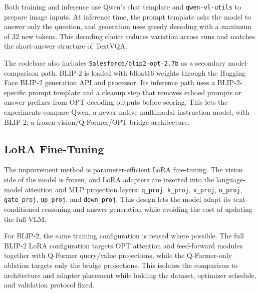 \documentclass[11pt]{article}
\begin{document}
Both training and inference use Qwen's chat template and \texttt{qwen-vl-utils} to prepare image inputs. At inference time, the prompt template asks the model to answer only the question, and generation uses greedy decoding with a maximum of 32 new tokens. This decoding choice reduces variation across runs and matches the short-answer structure of TextVQA.

The codebase also includes \texttt{Salesforce/blip2-opt-2.7b} as a secondary model-comparison path. BLIP-2 is loaded with bfloat16 weights through the Hugging Face BLIP-2 generation API and processor. Its inference path uses a BLIP-2-specific prompt template and a cleanup step that removes echoed prompts or answer prefixes from OPT decoding outputs before scoring. This lets the experiments compare Qwen, a newer native multimodal instruction model, with BLIP-2, a frozen-vision/Q-Former/OPT bridge architecture.

\subsection{LoRA Fine-Tuning}

The improvement method is parameter-efficient LoRA fine-tuning. The vision side of the model is frozen, and LoRA adapters are inserted into the language-model attention and MLP projection layers: \texttt{q\_proj}, \texttt{k\_proj}, \texttt{v\_proj}, \texttt{o\_proj}, \texttt{gate\_proj}, \texttt{up\_proj}, and \texttt{down\_proj}. This design lets the model adapt its text-conditioned reasoning and answer generation while avoiding the cost of updating the full VLM.

For BLIP-2, the same training configuration is reused where possible. The full BLIP-2 LoRA configuration targets OPT attention and feed-forward modules together with Q-Former query/value projections, while the Q-Former-only ablation targets only the bridge projections. This isolates the comparison to architecture and adapter placement while holding the dataset, optimizer schedule, and validation protocol fixed.
\end{document}
